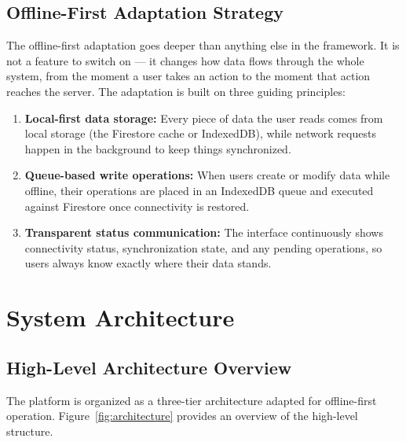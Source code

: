 \subsection{Offline-First Adaptation Strategy}

The offline-first adaptation goes deeper than anything else in the framework. It is not a feature to switch on --- it changes how data flows through the whole system, from the moment a user takes an action to the moment that action reaches the server. The adaptation is built on three guiding principles:

\begin{enumerate}
\item \textbf{Local-first data storage:} Every piece of data the user reads comes from local storage (the Firestore cache or IndexedDB), while network requests happen in the background to keep things synchronized.
\item \textbf{Queue-based write operations:} When users create or modify data while offline, their operations are placed in an IndexedDB queue and executed against Firestore once connectivity is restored.
\item \textbf{Transparent status communication:} The interface continuously shows connectivity status, synchronization state, and any pending operations, so users always know exactly where their data stands.
\end{enumerate}

\section{System Architecture}

\subsection{High-Level Architecture Overview}

The platform is organized as a three-tier architecture adapted for offline-first operation. Figure~\ref{fig:architecture} provides an overview of the high-level structure.

